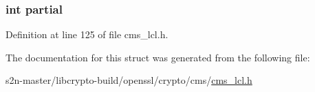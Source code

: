 \subsubsection[{\texorpdfstring{partial}{partial}}]{\setlength{\rightskip}{0pt plus 5cm}int partial}\hypertarget{struct_c_m_s___encapsulated_content_info__st_aa1f78d5d6584bbebecab02ba69f9b4ec}{}\label{struct_c_m_s___encapsulated_content_info__st_aa1f78d5d6584bbebecab02ba69f9b4ec}


Definition at line 125 of file cms\+\_\+lcl.\+h.



The documentation for this struct was generated from the following file\+:\begin{DoxyCompactItemize}
\item 
s2n-\/master/libcrypto-\/build/openssl/crypto/cms/\hyperlink{cms__lcl_8h}{cms\+\_\+lcl.\+h}\end{DoxyCompactItemize}
